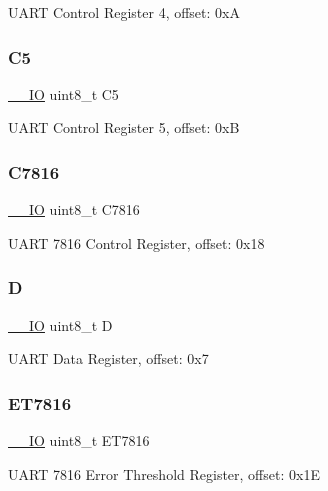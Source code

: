 U\+A\+RT Control Register 4, offset\+: 0xA \mbox{\label{struct_u_a_r_t___type_a5c3e6553034f7993105ebde9d573236b}} 
\subsubsection{\texorpdfstring{C5}{C5}}
{\footnotesize\ttfamily \mbox{\hyperlink{core__cm0plus_8h_aec43007d9998a0a0e01faede4133d6be}{\+\_\+\+\_\+\+IO}} uint8\+\_\+t C5}

U\+A\+RT Control Register 5, offset\+: 0xB \mbox{\label{struct_u_a_r_t___type_acdab11c41c499a94d80bd2d347ec97cb}} 
\subsubsection{\texorpdfstring{C7816}{C7816}}
{\footnotesize\ttfamily \mbox{\hyperlink{core__cm0plus_8h_aec43007d9998a0a0e01faede4133d6be}{\+\_\+\+\_\+\+IO}} uint8\+\_\+t C7816}

U\+A\+RT 7816 Control Register, offset\+: 0x18 \mbox{\label{struct_u_a_r_t___type_a6c0edcafd91c3baa698617799de6ec35}} 
\subsubsection{\texorpdfstring{D}{D}}
{\footnotesize\ttfamily \mbox{\hyperlink{core__cm0plus_8h_aec43007d9998a0a0e01faede4133d6be}{\+\_\+\+\_\+\+IO}} uint8\+\_\+t D}

U\+A\+RT Data Register, offset\+: 0x7 \mbox{\label{struct_u_a_r_t___type_aa2febdf8acc41a1c2092f4448fcd4211}} 
\subsubsection{\texorpdfstring{ET7816}{ET7816}}
{\footnotesize\ttfamily \mbox{\hyperlink{core__cm0plus_8h_aec43007d9998a0a0e01faede4133d6be}{\+\_\+\+\_\+\+IO}} uint8\+\_\+t E\+T7816}

U\+A\+RT 7816 Error Threshold Register, offset\+: 0x1E \mbox{\label{struct_u_a_r_t___type_ae76758451e5a49d5a7ecc5107aa6aaec}} 
